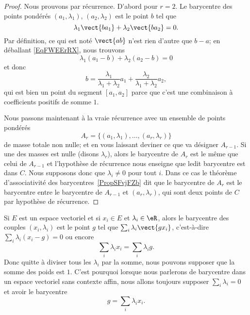 \begin{proof}
    Nous prouvons par récurrence. D'abord pour \( r=2\). Le barycentre des points pondérés \( (a_1,\lambda_1)\), \( (a_2,\lambda_2)\) est le point \( b\) tel que
    \begin{equation}        \label{EqFWEErRX}
        \lambda_1\vect{ ba_1 }+\lambda_2\vect{ ba_2 }=0.
    \end{equation}
    Par définition, ce qui est noté \( \vect{ ab }\) n'est rien d'autre que \( b-a\); en déballant \eqref{EqFWEErRX}, nous trouvons
    \begin{equation}
        \lambda_1(a_1-b)+\lambda_2(a_2-b)=0
    \end{equation}
    et donc
    \begin{equation}
        b=\frac{ \lambda_1 }{ \lambda_1+\lambda_2 }a_1+\frac{ \lambda_2 }{ \lambda_1+\lambda_2 }a_2,
    \end{equation}
    qui est bien un point du segment \( [a_1,a_2]\) parce que c'est une combinaison à coefficients positifs de somme \( 1\).

    Nous passons maintenant à la vraie récurrence avec un ensemble de points pondérés
    \begin{equation}
        A_r=\{ (a_1,\lambda_1),\ldots, (a_r,\lambda_r) \}
    \end{equation}
    de masse totale non nulle; et en vous laissant deviner ce que va désigner \( A_{r-1}\). Si une des masses est nulle (disons \( \lambda_r\)), alors le barycentre de \( A_r\) est le même que celui de \( A_{r-1}\) et l'hypothèse de récurrence nous enseigne que ledit barycentre est dans \( C\). Nous supposons donc que \( \lambda_i\neq 0\) pour tout \( i\). Dans ce cas le théorème d'associativité des barycentres~\ref{PropSFvjFZb} dit que le barycentre de \( A_r\) est le barycentre entre le barycentre de \( A_{r-1}\) et \( (a_r,\lambda_r)\), qui sont deux points de \( C\) par hypothèse de récurrence.
\end{proof}

Si \( E\) est un espace vectoriel et si \( x_i\in E\) et \( \lambda_i\in \eR\), alors le barycentre des couples \( (x_i,\lambda_i)\) est le point \( g\) tel que \( \sum_i\lambda_i\vect{ gx_i }\), c'est-à-dire \( \sum_i\lambda_i(x_i-g)=0\) ou encore
\begin{equation}
    \sum_i\lambda_ix_i=\sum_i\lambda_ig.
\end{equation}
Donc quitte à diviser tous les \( \lambda_i\) par la somme, nous pouvons supposer que la somme des poids est \( 1\). C'est pourquoi lorsque nous parlerons de barycentre dans un espace vectoriel sans contexte affin, nous allons toujours supposer \( \sum_i\lambda_i=0\) et avoir le barycentre
\begin{equation}
    g=\sum_i\lambda_ix_i.
\end{equation}

